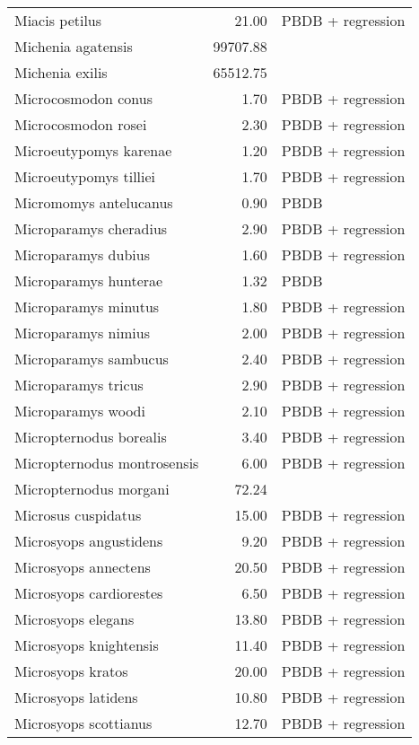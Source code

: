 \begin{table}[ht]
\begin{tabular}{lrl}
  Miacis petilus & 21.00 & PBDB + regression \\ 
  Michenia agatensis & 99707.88 & \cite{Tomiya2013} \\ 
  Michenia exilis & 65512.75 & \cite{Tomiya2013} \\ 
  Microcosmodon conus & 1.70 & PBDB + regression \\ 
  Microcosmodon rosei & 2.30 & PBDB + regression \\ 
  Microeutypomys karenae & 1.20 & PBDB + regression \\ 
  Microeutypomys tilliei & 1.70 & PBDB + regression \\ 
  Micromomys antelucanus & 0.90 & PBDB \\ 
  Microparamys cheradius & 2.90 & PBDB + regression \\ 
  Microparamys dubius & 1.60 & PBDB + regression \\ 
  Microparamys hunterae & 1.32 & PBDB \\ 
  Microparamys minutus & 1.80 & PBDB + regression \\ 
  Microparamys nimius & 2.00 & PBDB + regression \\ 
  Microparamys sambucus & 2.40 & PBDB + regression \\ 
  Microparamys tricus & 2.90 & PBDB + regression \\ 
  Microparamys woodi & 2.10 & PBDB + regression \\ 
  Micropternodus borealis & 3.40 & PBDB + regression \\ 
  Micropternodus montrosensis & 6.00 & PBDB + regression \\ 
  Micropternodus morgani & 72.24 & \cite{Tomiya2013} \\ 
  Microsus cuspidatus & 15.00 & PBDB + regression \\ 
  Microsyops angustidens & 9.20 & PBDB + regression \\ 
  Microsyops annectens & 20.50 & PBDB + regression \\ 
  Microsyops cardiorestes & 6.50 & PBDB + regression \\ 
  Microsyops elegans & 13.80 & PBDB + regression \\ 
  Microsyops knightensis & 11.40 & PBDB + regression \\ 
  Microsyops kratos & 20.00 & PBDB + regression \\ 
  Microsyops latidens & 10.80 & PBDB + regression \\ 
  Microsyops scottianus & 12.70 & PBDB + regression \\ 

\end{tabular}
\end{table}
